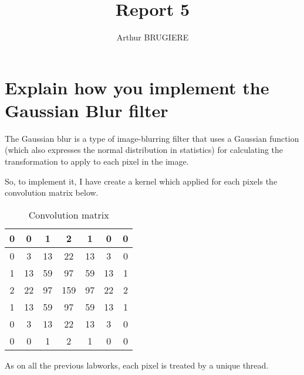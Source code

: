 \documentclass[11pt]{article} %
\title{Report 5}
\author{Arthur BRUGIERE}
\begin{document}
\maketitle

\section{Explain how you implement the Gaussian Blur filter}

The Gaussian blur is a type of image-blurring filter that uses a Gaussian function (which also expresses the normal distribution in statistics) for calculating the transformation to apply to each pixel in the image.

So, to implement it, I have create a kernel which applied for each pixels the convolution matrix below.

\begin{table}[h]
\begin{center}
  \begin{tabular}{ | c | c | c | c | c | c | c | }
    \hline
	0 & 0 & 1 & 2 & 1 & 0 & 0 \\ \hline
	0 & 3 & 13 & 22 & 13 & 3 & 0 \\ \hline
	1 & 13 & 59 & 97 & 59 & 13 & 1 \\ \hline
	2 & 22 & 97 & 159 & 97 & 22 & 2 \\ \hline
	1 & 13 & 59 & 97 & 59 & 13 & 1 \\ \hline
	0 & 3 & 13 & 22 & 13 & 3 & 0 \\ \hline
	0 & 0 & 1 & 2 & 1 & 0 & 0 \\
    \hline
  \end{tabular}
   \caption{Convolution matrix}
\end{center}
\end{table}

As on all the previous labworks, each pixel is treated by a unique thread.

%
\end{document}
